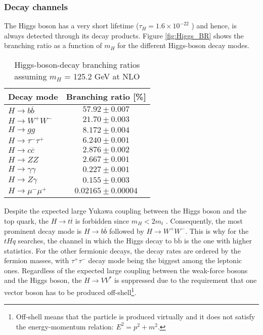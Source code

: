 \subsubsection{\label{subsubsec:Higgs_Decay_channels}Decay channels}
\noindent The Higgs boson has a very short lifetime ($\tau_H = 1.6 \times 10^{-22}$ \cite{Higgs_production}) and hence, is always detected through its decay products. Figure \ref{fig:Higgs_BR} shows the branching ratio as a function of $m_H$ for the different Higgs-boson decay modes.\\
\begin{table}[H]
\centering
\small
\caption{Higgs-boson-decay branching ratios assuming $m_H$ = 125.2 GeV at NLO \cite{Higgs_production}}
\label{tab:Higgs_decays}
\begin{tabular}{lc}
\hline
Decay mode                    & Branching ratio [\%] \\ \hline
$H \rightarrow b\overline{b}$ & $57.92 \pm 0.007$  \\
$H \rightarrow W^+ W^-$        & $21.70 \pm 0.003$       \\
$H \rightarrow gg$            & $8.172 \pm 0.004$        \\
$H \rightarrow\tau^-\tau^+$   & $6.240 \pm 0.001$        \\
$H \rightarrow c\overline{c}$ & $2.876 \pm 0.002$      \\
$H \rightarrow ZZ$            & $2.667 \pm 0.001$      \\
$H \rightarrow \gamma\gamma$  & $0.227 \pm 0.001$      \\
$H \rightarrow Z\gamma$       & $0.155 \pm 0.003$      \\
$H \rightarrow \mu^-\mu^+$    & $0.02165 \pm 0.00004$                
\end{tabular}
\end{table}
\indent Despite the expected large Yukawa coupling between the Higgs boson and the top quark, the $H \rightarrow t\overline{t} $ is forbidden since $m_H < 2m_t$ . Consequently, the most prominent decay mode is $H \rightarrow b\overline{b}$ followed by $H \rightarrow W^+ W^-$. This is why for the $tHq$ searches, the channel in which the Higgs decay to b$\overline{\text{b}}$ is the one with higher statistics. For the other fermionic decays, the decay rates are ordered by the fermion masses, with $\tau^+\tau^-$ decay mode being the biggest among the leptonic ones. Regardless of the expected large coupling between the weak-force bosons and the Higgs boson, the $H \rightarrow VV^*$ is suppressed due to the requirement that one vector boson has to be produced off-shell\footnote{Off-shell means that the particle is produced virtually and it does not satisfy the energy-momentum relation: $E^2 = p^2 + m^2$.}.\\
